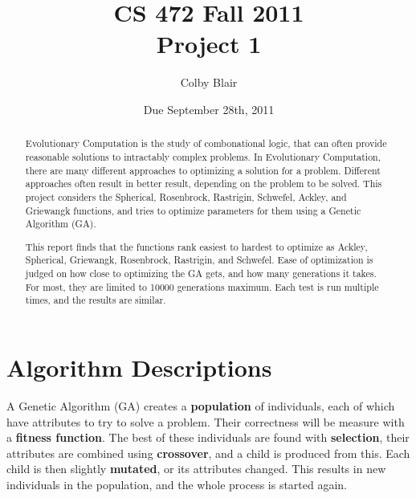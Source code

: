 \documentclass[12pt]{article}
\title{CS 472 Fall 2011 \\
     Project 1}
\author{Colby Blair}
\date{Due September 28th, 2011}
\begin{document}
\maketitle

\begin{abstract}
Evolutionary Computation is the study of combonational logic, that can often provide reasonable solutions to
intractably complex problems. In Evolutionary Computation, there are many different approaches to optimizing a solution for a problem. Different approaches often result in better result, depending on the problem to be solved. This project considers the Spherical, Rosenbrock, Rastrigin, Schwefel, Ackley, and Griewangk functions, and tries to optimize parameters for them using a Genetic Algorithm (GA).

This report finds that the functions rank easiest to hardest to optimize as Ackley, Spherical, Griewangk, Rosenbrock, Rastrigin, and Schwefel. Ease of optimization is judged on how close to optimizing the GA gets, and how many generations it takes. For most, they are limited to 10000 generations maximum. Each test is run multiple times, and the results are similar.
\end{abstract}
\pagebreak

\part{Algorithm Descriptions}
\label{part:alg_desc}

A Genetic Algorithm (GA) creates a \textbf{population} of individuals, each of which have attributes to try to solve a problem. Their correctness will be measure with a \textbf{fitness function}. The best of these individuals are found with \textbf{selection}, their attributes are combined using \textbf{crossover}, and a child is produced from this. Each child is then slightly \textbf{mutated}, or its attributes changed. This results in new individuals in the population, and the whole process is started again.
\end{document}
